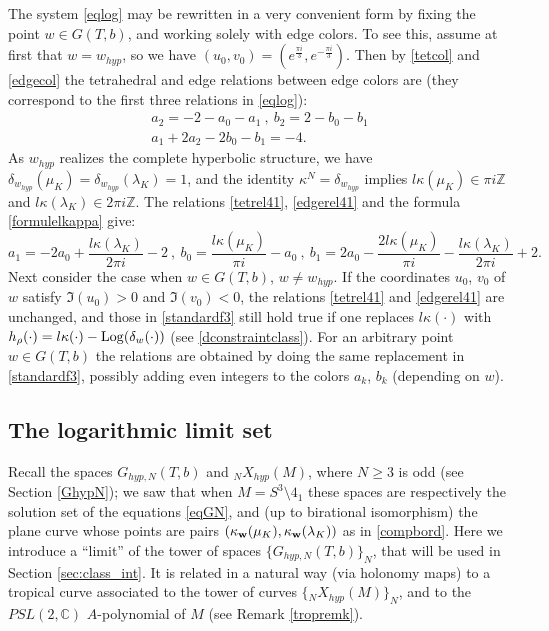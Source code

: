 \documentclass[11pt]{amsart}
\newcommand{\mc}{\mathbb{C}}
\newcommand{\mz}{\mathbb{Z}}
\newcommand{\bw}{{\bf w}}
\newcommand{\Log}{{\rm Log}}
\begin{document}
{The system \eqref{eqlog} may be rewritten in a very convenient form by fixing the point $w\in G(T,b)$, and working solely with edge colors. To see this, assume at first that $w=w_{hyp}$, so we have $(u_0,v_0)=(e^{\frac{\pi i}{3}}, e^{-\frac{\pi i}{3}})$. Then by \eqref{tetcol} and \eqref{edgecol} the tetrahedral and edge relations between edge colors are (they correspond to the first three relations in \eqref{eqlog}):
\begin{align}a_2=-2-a_0-a_1\ ,\ b_2=2-b_0-b_1\label{tetrel41}\\
a_1+2a_2-2b_0-b_1 = -4.\quad \quad \quad \label{edgerel41}
\end{align}
As $w_{hyp}$ realizes the complete hyperbolic structure, we have $\delta_{w_{hyp}}(\mu_K)=\delta_{w_{hyp}}(\lambda_K)=1$, and the identity $\kappa^N = \delta_{w_{hyp}}$ implies $l\kappa(\mu_K)\in \pi i \mz$ and $l\kappa(\lambda_K)\in 2\pi i \mz$. The relations \eqref{tetrel41}, \eqref{edgerel41} and the formula \eqref{formulelkappa} give:
\begin{equation}\label{standardf3} a_1=-2a_0+\frac{l\kappa(\lambda_K)}{2\pi i}-2\ ,\ b_0 = \frac{l\kappa(\mu_K)}{\pi i}-a_0\ ,\ b_1 = 2a_0-\frac{2l\kappa(\mu_K)}{\pi i}-\frac{l\kappa(\lambda_K)}{2\pi i}+2.
\end{equation}
Next consider the case when $w\in G(T,b)$, $w\ne w_{hyp}$. If the coordinates $u_0$, $v_0$ of $w$ satisfy $\mathfrak{I}(u_0)>0$ and $\mathfrak{I}(v_0)<0$, the relations \eqref{tetrel41} and \eqref{edgerel41} are unchanged, and those in \eqref{standardf3} still hold true if one replaces $l\kappa(\cdot)$ with $h_\rho(\cdot) =l\kappa(\cdot )-\Log(\delta_w(\cdot))$ (see \eqref{dconstraintclass}). For an arbitrary point $w\in G(T,b)$ the relations are obtained by doing the same replacement in \eqref{standardf3}, possibly adding even integers to the colors $a_k$, $b_k$ (depending on $w$). 

\subsection{The logarithmic limit set}\label{ASYWEIGHTS} Recall the spaces $G_{hyp,N}(T,b)$ and ${}_NX_{hyp}(M)$, where $N\geq 3$ is odd (see Section \ref{GhypN}); we saw that when $M=S^3\setminus 4_1$ these spaces are respectively the solution set of the equations \eqref{eqGN}, and (up to birational isomorphism) the plane curve whose points are  pairs $(\kappa_\bw(\mu_K),\kappa_\bw(\lambda_K))$ as in \eqref{compbord}. Here we introduce a ``limit'' of the tower of spaces $\{G_{hyp,N}(T,b)\}_N$, that will be used in Section \ref{sec:class_int}. It is related in a natural way (via holonomy maps) to a tropical curve associated to the tower of curves $\{{}_NX_{hyp}(M)\}_N$, and to the $PSL(2,\mc)$ $A$-polynomial of $M$ (see Remark \ref{tropremk}). 

}
\end{document}
